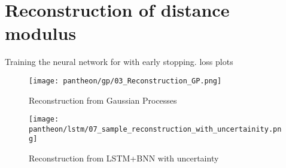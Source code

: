 \section{Reconstruction of distance modulus}
Training the neural network for with early stopping. loss plots
\begin{figure}
	\centering
	\texttt{[image: pantheon/gp/03\_Reconstruction\_GP.png]}
	\caption{Reconstruction from Gaussian Processes}
	\label{fig:lstm_re}
\end{figure}
\begin{figure}
	\centering
	\texttt{[image: pantheon/lstm/07\_sample\_reconstruction\_with\_uncertainity.png]}
	\caption{Reconstruction from LSTM+BNN with uncertainty}
	\label{fig:lstm_re}
\end{figure}

